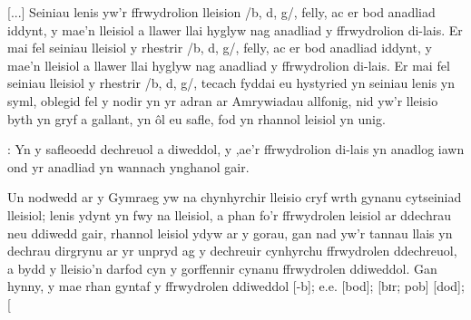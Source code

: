 [...] Seiniau lenis yw'r ffrwydrolion lleision /b, d, g/, felly, ac er bod anadliad iddynt, y mae'n lleisiol a llawer llai hyglyw nag anadliad y ffrwydrolion di-lais. Er mai fel seiniau lleisiol y rhestrir /b, d, g/, felly, ac er bod anadliad iddynt, y mae'n lleisiol a llawer llai hyglyw nag anadliad y ffrwydrolion di-lais. Er mai fel seiniau lleisiol y rhestrir /b, d, g/, tecach fyddai eu hystyried yn seiniau lenis yn syml, oblegid fel y nodir yn yr adran ar Amrywiadau allfonig, nid yw'r lleisio byth yn gryf a gallant, yn \^ol eu safle, fod yn rhannol leisiol yn unig. 

\textcite[37--38]{thomas_tafodiaith_1993}:
Yn y safleoedd dechreuol a diweddol, y ,ae'r ffrwydrolion di-lais yn anadlog iawn ond yr anadliad yn wannach ynghanol gair.

Un nodwedd ar y Gymraeg yw na chynhyrchir lleisio cryf wrth gynanu cytseiniad lleisiol; lenis ydynt yn fwy na lleisiol, a phan fo'r ffrwydrolen leisiol ar ddechrau neu ddiwedd gair, rhannol leisiol ydyw ar y gorau, gan nad yw'r tannau llais yn dechrau dirgrynu ar yr unpryd ag y dechreuir cynhyrchu ffrwydrolen ddechreuol, a bydd y lleisio'n darfod cyn y gorffennir cynanu ffrwydrolen ddiweddol. Gan hynny, y mae rhan gyntaf y ffrwydrolen ddiweddol [-b\bd]; e.e. [\bd bod\dd]; [\bd bɪr; pob\bd] [\bd dod\bd]; [\bd